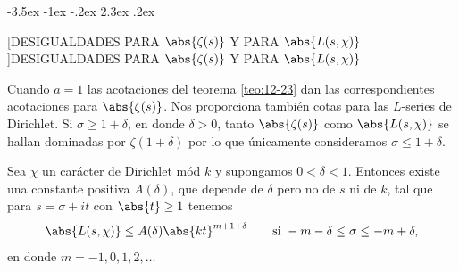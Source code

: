 \documentclass[12pt,a4paper]{book}
\makeatletter
\renewcommand\section{\@startsection{section}{1}{\z@}%
  {-3.5ex \@plus -1ex \@minus -.2ex}%
  {2.3ex \@plus .2ex}%
  {\normalfont\Large\bfseries\raggedright}}
\makeatother
\begin{document}
    \section[DESIGUALDADES PARA \texorpdfstring{$\abs{\zeta(s)}$}{|ζ(s)|} Y PARA \texorpdfstring{$\abs{L(s,\chi)}$}{|L(s,χ)|}]{DESIGUALDADES PARA \texorpdfstring{$\abs{\zeta(s)}$}{|ζ(s)|} Y PARA \texorpdfstring{$\abs{L(s,\chi)}$}{|L(s,χ)|}}

    Cuando $a=1$ las acotaciones del teorema \ref{teo:12-23} dan las correspondientes
    acotaciones para $\abs{\zeta(s)}$. Nos proporciona también cotas para las $L$-series de
    Dirichlet. Si $\sigma\geq1+\delta$, en donde $\delta>0$, tanto $\abs{\zeta(s)}$ como
    $\abs{L(s,\chi)}$ se hallan dominadas por $\zeta(1+\delta)$ por lo que únicamente
    consideramos $\sigma\leq1+\delta$.

    \begin{teorema}\label{teo:12-24}
        Sea $\chi$ un carácter de Dirichlet mód $k$ y supongamos $0<\delta<1$. Entonces existe
        una constante positiva $A(\delta)$, que depende de $\delta$ pero no de $s$ ni de $k$,
        tal que para $s=\sigma+it$ con $\abs{t}\geq1$ tenemos
        \begin{equation}\label{eq:12-33}
            \abs{L(s,\chi)}\leq A(\delta)\abs{kt}^{m+1+\delta}\qquad\text{si }-m-\delta\leq\sigma\leq-m+\delta,
        \end{equation}
        en donde $m=-1,0,1,2,\dots$
    \end{teorema}
\end{document}
